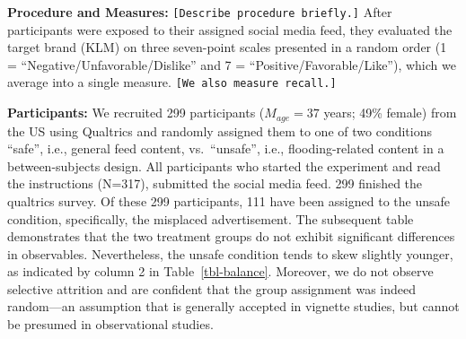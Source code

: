 \documentclass[
  a4paper,
]{scrreprt}
\begin{document}
\textbf{Procedure and Measures:}
\texttt{{[}Describe\ procedure\ briefly.{]}} After participants were
exposed to their assigned social media feed, they evaluated the target
brand (KLM) on three seven-point scales presented in a random order (1 =
``Negative/Unfavorable/Dislike'' and 7 = ``Positive/Favorable/Like''),
which we average into a single measure.
\texttt{{[}We\ also\ measure\ recall.{]}}

\textbf{Participants:} We recruited 299 participants (\(M_{age} = 37\)
years; 49\% female) from the US using Qualtrics and randomly assigned
them to one of two conditions ``safe'', i.e., general feed content,
vs.~``unsafe'', i.e., flooding-related content in a between-subjects
design. All participants who started the experiment and read the
instructions (N=317), submitted the social media feed. 299 finished the
qualtrics survey. Of these 299 participants, 111 have been assigned to
the unsafe condition, specifically, the misplaced advertisement. The
subsequent table demonstrates that the two treatment groups do not
exhibit significant differences in observables. Nevertheless, the unsafe
condition tends to skew slightly younger, as indicated by column 2 in
Table~\ref{tbl-balance}. Moreover, we do not observe selective attrition
and are confident that the group assignment was indeed random---an
assumption that is generally accepted in vignette studies, but cannot be
presumed in observational studies.
\end{document}
